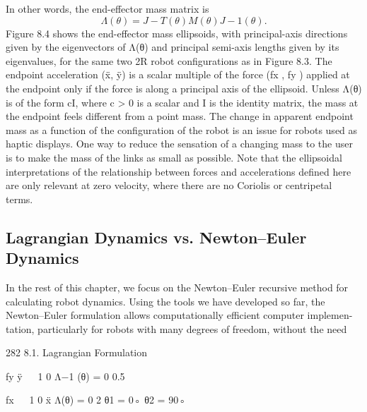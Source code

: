 \documentclass[12pt,a4paper]{article}
\begin{document}
In other words, the end-effector mass matrix is
\begin{equation}
Λ(θ) = J −T (θ)M (θ)J −1 (θ).
\label{eq:8.21}
\end{equation}
Figure 8.4 shows the end-effector mass ellipsoids, with principal-axis directions
given by the eigenvectors of Λ(θ) and principal semi-axis lengths given by its
eigenvalues, for the same two 2R robot configurations as in Figure 8.3. The
endpoint acceleration (ẍ, ÿ) is a scalar multiple of the force (fx , fy ) applied at
the endpoint only if the force is along a principal axis of the ellipsoid. Unless
Λ(θ) is of the form cI, where c > 0 is a scalar and I is the identity matrix, the
mass at the endpoint feels different from a point mass.
    The change in apparent endpoint mass as a function of the configuration of
the robot is an issue for robots used as haptic displays. One way to reduce the
sensation of a changing mass to the user is to make the mass of the links as
small as possible.
    Note that the ellipsoidal interpretations of the relationship between forces
and accelerations defined here are only relevant at zero velocity, where there are
no Coriolis or centripetal terms.

\subsection{Lagrangian Dynamics vs. Newton–Euler Dynamics}
In the rest of this chapter, we focus on the Newton–Euler recursive method
for calculating robot dynamics. Using the tools we have developed so far, the
Newton–Euler formulation allows computationally efficient computer implemen-
tation, particularly for robots with many degrees of freedom, without the need


282                                                                            8.1. Lagrangian Formulation

                                                                                   fy
              ÿ
                                                                          
                                                                  1 0
                                       Λ−1 (θ) =
                                                                  0 0.5

                                                                                               fx
                                                                  
                                                          1       0
                                ẍ     Λ(θ) =
                                                          0       2                        θ1 = 0◦
                                                                                           θ2 = 90◦
\end{document}
